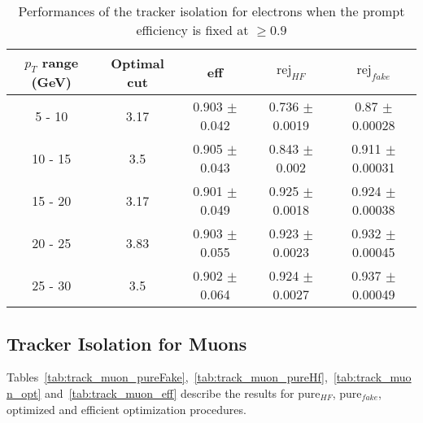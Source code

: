 \begin{table}[htbp]
   \centering
   \begin{tabular}{|c|c|c|c|c|}
      \hline
      $p_T$ range (GeV) & Optimal cut & eff & $\textrm{rej}_{HF}$ & $\textrm{rej}_{fake}$ \\
      \hline
      5 - 10 & 3.17 & 0.903 $\pm$ 0.042 & 0.736 $\pm$ 0.0019 & 0.87 $\pm$ 0.00028 \\
      \hline
      10 - 15 & 3.5 & 0.905 $\pm$ 0.043 & 0.843 $\pm$ 0.002 & 0.911 $\pm$ 0.00031 \\
      \hline
      15 - 20 & 3.17 & 0.901 $\pm$ 0.049 & 0.925 $\pm$ 0.0018 & 0.924 $\pm$ 0.00038 \\
      \hline
      20 - 25 & 3.83 & 0.903 $\pm$ 0.055 & 0.923 $\pm$ 0.0023 & 0.932 $\pm$ 0.00045 \\
      \hline
      25 - 30 & 3.5 & 0.902 $\pm$ 0.064 & 0.924 $\pm$ 0.0027 & 0.937 $\pm$ 0.00049 \\
      \hline
   \end{tabular}
   \caption{\small{Performances of the tracker isolation for electrons when the prompt efficiency is fixed at $\geq 0.9$}\label{tab:track_elec_eff}}
\end{table}



\subsection{Tracker Isolation for Muons}
\label{app:tables_mu}
Tables~\ref{tab:track_muon_pureFake},~\ref{tab:track_muon_pureHf},~\ref{tab:track_muon_opt} and~\ref{tab:track_muon_eff}
describe the results for pure$_{HF}$, pure$_{fake}$, optimized and efficient optimization procedures.



